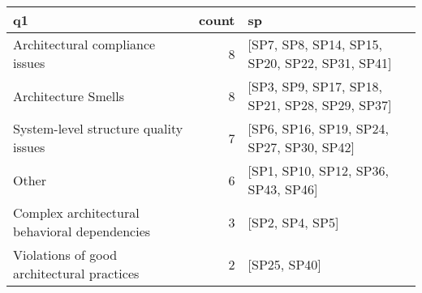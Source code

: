 \begin{tabular}{lrl}
\toprule
                                            q1 &  count &                                              sp \\
\midrule
               Architectural compliance issues &      8 &  [SP7, SP8, SP14, SP15, SP20, SP22, SP31, SP41] \\
                           Architecture Smells &      8 &  [SP3, SP9, SP17, SP18, SP21, SP28, SP29, SP37] \\
         System-level structure quality issues &      7 &       [SP6, SP16, SP19, SP24, SP27, SP30, SP42] \\
                                         Other &      6 &             [SP1, SP10, SP12, SP36, SP43, SP46] \\
 Complex architectural behavioral dependencies &      3 &                                 [SP2, SP4, SP5] \\
    Violations of good architectural practices &      2 &                                    [SP25, SP40] \\
\bottomrule
\end{tabular}
